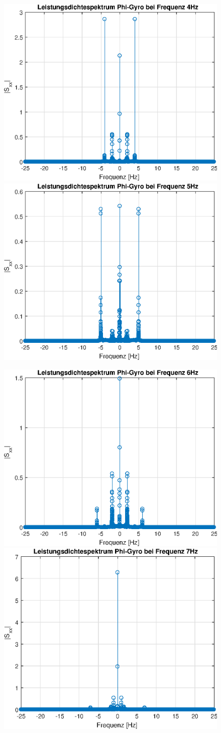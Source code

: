 \documentclass{article}
\begin{document}
\begin{figure}[h!]
\includegraphics[width=0.5\linewidth]{img/lds_phi_g_5}
\includegraphics[width=0.5\linewidth]{img/lds_phi_g_6}
\end{figure}
\newpage
\begin{figure}[h!]
\includegraphics[width=0.5\linewidth]{img/lds_phi_g_7}
\includegraphics[width=0.5\linewidth]{img/lds_phi_g_8}
\end{figure}
\end{document}
